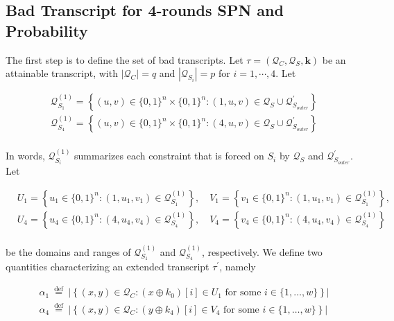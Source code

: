\subsection{Bad Transcript for 4-rounds SPN and Probability}

\noindent The first step is to define the set of bad transcripts. Let $\tau = (\mathcal{Q}_C, \mathcal{Q}_{S}, \mathbf{k})$ be an attainable transcript, with $|\mathcal{Q}_C| = q$ and $|\mathcal{Q}_{S_i}| = p$ for $i = 1, \cdots, 4$. Let

$$
\begin{aligned}
&\mathcal{Q}_{S_{1}}^{(1)}=\left\{(u, v) \in\{0,1\}^{n} \times\{0,1\}^{n}:(1, u, v) \in \mathcal{Q}_{S} \cup \mathcal{Q}_{S_{outer}}^{\prime}\right\}\\
&\mathcal{Q}_{S_{4}}^{(1)}=\left\{(u, v) \in\{0,1\}^{n} \times\{0,1\}^{n}:(4, u, v) \in \mathcal{Q}_{S} \cup \mathcal{Q}_{S_{outer}}^{\prime}\right\}\\
\end{aligned}
$$

\noindent In words, $\mathcal{Q}_{S_{i}}^{(1)}$ summarizes each constraint that is forced on $S_{i}$ by $\mathcal{Q}_{S}$ and $\mathcal{Q}_{S_{outer}}^{\prime}$. Let 

$$
\begin{aligned}
&U_{1}=\left\{u_{1} \in\{0,1\}^{n}:\left(1, u_{1}, v_{1}\right) \in \mathcal{Q}_{S_{1}}^{(1)}\right\}, \quad V_{1}=\left\{v_{1} \in\{0,1\}^{n}:\left(1, u_{1}, v_{1}\right) \in \mathcal{Q}_{S_{1}}^{(1)}\right\},\\
&U_{4}=\left\{u_{4} \in\{0,1\}^{n}:\left(4, u_{4}, v_{4}\right) \in \mathcal{Q}_{S_{4}}^{(1)}\right\}, \quad V_{4}=\left\{v_{4} \in\{0,1\}^{n}:\left(4, u_{4}, v_{4}\right) \in \mathcal{Q}_{S_{4}}^{(1)}\right\}\\
\end{aligned}
$$

\noindent be the domains and ranges of $\mathcal{Q}_{S_{1}}^{(1)}$ and $\mathcal{Q}_{S_{4}}^{(1)}$, respectively. We define two quantities characterizing an extended transcript $\tau^{\prime}$, namely

$$
\begin{aligned}
&\alpha_{1} \stackrel{\text { def }}{=} |\left\{(x, y) \in \mathcal{Q}_{C}: \left(x \oplus k_{0}\right)[i] \in U_{1} \text { for some } i \in\{1, \ldots, w\}\right\} |\\
&\alpha_{4} \stackrel{\text { def }}{=} |\left\{(x, y) \in \mathcal{Q}_{C}: \left(y \oplus k_{4}\right)[i] \in V_{4} \text { for some } i \in\{1, \ldots, w\}\right\} |
\end{aligned}
$$


